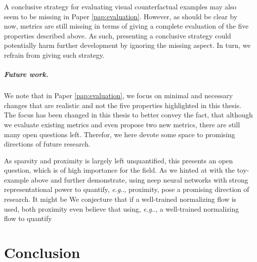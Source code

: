 \documentclass[11pt,a4paper,twoside,openright,final]{memoir}
\makeatletter
\DeclareRobustCommand\onedot{\futurelet\@let@token\@onedot}
\def\@onedot{\ifx\@let@token.\else.\null\fi\xspace}
\def\eg{\emph{e.g}\onedot} \def\Eg{\emph{E.g}\onedot}
\newcommand*{\paperref}[1]{Paper \hyperref[#1]{\ref{#1}}}
\makeatother
\begin{document}
A conclusive strategy for evaluating visual counterfactual examples may also seem to be missing in \paperref{pap:evaluation}. 
However, as should be clear by now, metrics are still missing in terms of giving a complete evaluation of the five properties described above.
As such, presenting a conclusive strategy could potentially harm further development by ignoring the missing aspect. 
In turn, we refrain from giving such strategy. 

\paragraph{Future work.}
We note that in \paperref{pap:evaluation}, we focus on minimal and necessary changes that are realistic and not the five properties highlighted in this thesis.
The focus has been changed in this thesis to better convey the fact, that although we evaluate existing metrics and even propose two new metrics, there are still many open questions left. 
Therefor, we here devote some space to promising directions of future research. 

As sparsity and proximity is largely left unquantified, this presents an open question, which is of high importance for the field.
As we hinted at with the toy-example above and \citet{Rodriguez2021} further demonstrate, using neep neural networks with strong representational power to quantify, \eg, proximity, pose a promising direction of research.
It might be 
We conjecture that if a well-trained normalizing flow is used, both proximity
even believe that using, \eg, a well-trained normalizing flow to quantify

%
    
\chapter{Conclusion} 
\end{document}
